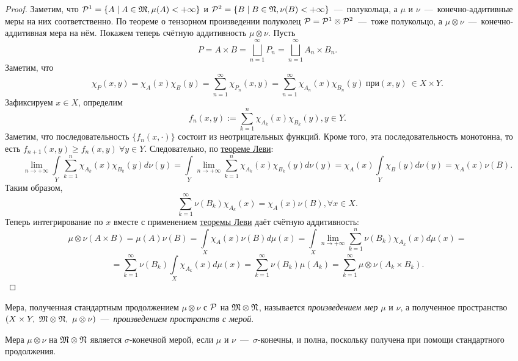 \begin{proof}
    Заметим, что $\mathcal{P}^1 = \{A \mid A \in \mathfrak{M}, \mu(A) < +\infty\}$ и $\mathcal{P}^2 = \{B \mid B \in \mathfrak{N}, \nu(B) < +\infty\}$~---~полукольца, а $\mu$ и $\nu$~---~конечно-аддитивные меры на них соответственно. По теореме о тензорном произведении полуколец $\mathcal{P} = \mathcal{P}^1 \otimes \mathcal{P}^2$~---~тоже полукольцо, а $\mu \otimes \nu$~---~конечно-аддитивная мера на нём. Покажем теперь счётную аддитивность $\mu \otimes \nu$. Пусть \[P = A \times B = \bigsqcup\limits_{n = 1}^\infty P_n= \bigsqcup\limits_{n = 1}^\infty A_n \times B_n.\]
    Заметим, что \[\chi_{P}(x, y) = \chi_A(x)\chi_B(y) = \sum\limits_{n = 1}^\infty \chi_{P_n}(x, y) = \sum\limits_{n = 1}^\infty \chi_{A_n}(x)\chi_{B_n}(y) \  \text{при} (x, y) \  \in X \times Y.\]
    Зафиксируем $x \in X$, определим \[f_n (x, y) := \sum\limits_{k = 1}^n \chi_{A_k}(x)\chi_{B_k}(y), y \in Y.\]
    Заметим, что последовательность $\{f_n(x, \cdot)\}$ состоит из неотрицательных функций. Кроме того, эта последовательность монотонна, то есть $f_{n + 1}(x, y) \geq f_n(x, y) \  \forall y \in Y$. Следовательно, по \hyperlink{beppo_levi}{теореме Леви}: \[\lim\limits_{n \rightarrow +\infty} \int\limits_{Y} \sum\limits_{k = 1}^n \chi_{A_k}(x)\chi_{B_k}(y)d\nu(y) = \int\limits_Y \lim\limits_{n \rightarrow +\infty} \sum\limits_{k = 1}^n \chi_{A_k}(x)\chi_{B_k}(y)d\nu(y) = \chi_A(x)\int\limits_Y \chi_B(y)d\nu(y) = \chi_A(x)\nu(B).\]
    Таким образом, \[\sum\limits_{k = 1}^\infty \nu(B_k)\chi_{A_k}(x) = \chi_A(x)\nu(B), \forall x \in X.\]
    Теперь интегрирование по $x$ вместе с применением \hyperlink{beppo_levi}{теоремы Леви} даёт счётную аддитивность: \[\mu\otimes\nu(A \times B) =  \mu(A)\nu(B) = \int\limits_{X}\chi_A(x)\nu(B)d\mu(x) = \int\limits_X \lim\limits_{n \rightarrow +\infty}\sum\limits_{k = 1}^n\nu(B_k)\chi_{A_k}(x)d\mu(x) = \]\[ = \sum\limits_{k = 1}^\infty \nu(B_k) \int\limits_X \chi_{A_k}(x)d\mu(x) = \sum\limits_{k = 1}^\infty \nu(B_k)\mu(A_k) = \sum\limits_{k = 1}^\infty \mu\otimes\nu(A_k \times B_k).\]
\end{proof}
\begin{definition}
    Мера, полученная стандартным продолжением $\mu \otimes \nu$ с $\mathcal{P}$ на $\mathfrak{M} \otimes \mathfrak{N}$, называется \textit{произведением мер} $\mu$ и $\nu$, а полученное пространство $(X \times Y, \ \mathfrak{M} \otimes \mathfrak{N}, \ \mu \otimes \nu)$~---~\textit{произведением пространств с мерой}.
\end{definition}
\begin{note}
    Мера $\mu \otimes \nu$ на $\mathfrak{M} \otimes \mathfrak{N}$ является $\sigma$-конечной мерой, если $\mu$ и $\nu$~---~$\sigma$-конечны, и полна, поскольку получена при помощи стандартного продолжения.
\end{note}
